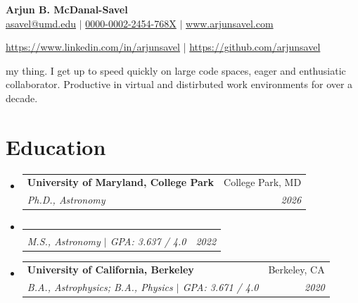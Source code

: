 \documentclass[letterpaper,12pt]{article}
\makeatletter
\newcommand{\resumeItemNoBullet}[2]{
  \item[]\small{
    \hspace{-9pt}\textbf{#1}{: #2 \vspace{-6pt}}
  }
}
\newcommand{\resumeSubheading}[4]{
  \vspace{-1pt}\item[]
  \begin{tabular*}{0.98\textwidth}{l@{\extracolsep{\fill}}r}
      \hspace{-10pt}\textbf{#1} & #2 \\
      \hspace{-10pt}\textit{\small#3} & \textit{\small #4} \\
    \end{tabular*}\vspace{-5pt}
}
\newcommand{\resumeSubHeadingListStart}{\begin{itemize}[leftmargin=*]}
\newcommand{\resumeSubHeadingListEnd}{\end{itemize}}
\newcommand{\shorterSection}[1]{\vspace{-10pt}\section{#1}}
\makeatother
\begin{document}
\thispagestyle{empty}



\begin{center}
  \small \textbf{\large Arjun B. McDanal-Savel} \\
 \textsf{\small \href{href="mailto:asavel@umd.edu"}{asavel@umd.edu}} $\vert$   \href{https://orcid.org/0000-0002-2454-768X/}{0000-0002-2454-768X} $\vert$ \href{www.arjunsavel.com}{www.arjunsavel.com} \par {} \hspace{2pt} \href{ https://www.linkedin.com/in/arjunsavel}{https://www.linkedin.com/in/arjunsavel}  |
  \faGithubSquare \hspace{2pt} \href{https://github.com/arjunsavel}{https://github.com/arjunsavel}
\end{center}
\vspace{1pt}

my thing. I get up to speed quickly on large code spaces, eager and enthusiatic collaborator. Productive in virtual and distirbuted work environments for over a decade.

\shorterSection{Education}
  \resumeSubHeadingListStart
    \resumeSubheading
      {University of Maryland, College Park}{College Park, MD}
      {Ph.D., Astronomy}{2026}{
    }
    \vspace{-37pt}
    \resumeSubheading
    {}{}{M.S., Astronomy $\vert$ GPA: 3.637 / 4.0}{2022}{
    }
    \vspace{-20pt}
    \resumeSubheading
      {University of California, Berkeley}{Berkeley, CA}
      {B.A., Astrophysics; B.A., Physics $\vert$ GPA: 3.671 / 4.0}{2020}{
    }

  \resumeSubHeadingListEnd
\end{document}
